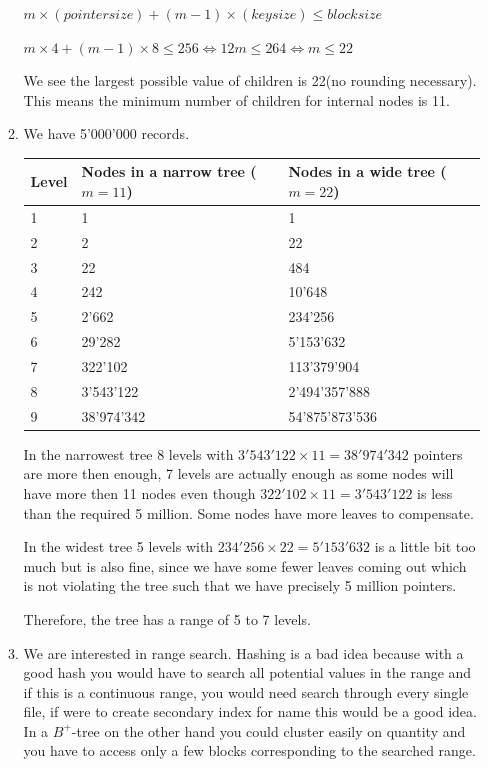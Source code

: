 \documentclass[12pt]{extarticle}
\begin{document}
\begin{flushleft}
\begin{enumerate}[label=\textbf{\Alph*.}]
\begin{enumerate}[label=\arabic*)]
$ m \times (pointer size) + (m-1) \times (key size)\leq block size$

$m \times 4+ (m-1) \times 8 \leq 256 \Leftrightarrow 12m\leq264\Leftrightarrow m\leq 22$

We see the largest possible value of children is 22(no rounding necessary). This means the minimum number of children for internal nodes is 11. 
\item 
We have 5'000'000 records. 

\begin{tabular}{lll}
\hline
Level & Nodes in a narrow tree (\(m=11\))& Nodes in a wide tree (\(m=22\))\\
\hline
1     & 1          & 1          \\
2     & 2          & 22         \\
3     & 22         & 484        \\
4     & 242        & 10'648     \\
5     & 2'662      & 234'256    \\
6     & 29'282     & 5'153'632\\
7     & 322'102    & 113'379'904\\
8     & 3'543'122  & 2'494'357'888\\
9	& 38'974'342&54'875'873'536\\
\hline
\end{tabular}

In the narrowest tree 8 levels with $3'543'122\times 11=38'974'342$ pointers are more then enough, 7 levels are actually enough as some nodes will have more then 11 nodes even though $ 322'102\times 11 = 3'543'122$ is less than the required 5 million. Some nodes have more leaves to compensate.

In the widest tree 5 levels with $234'256 \times 22=5'153'632$ is a little bit too much but is also fine, since we have some fewer leaves coming out which is not violating the tree such that we have precisely 5 million pointers.  

Therefore, the tree has a range of 5 to 7 levels.
\item We are interested in range search. Hashing is a bad idea because with a good hash you would have to search all potential values in the range and if this is a continuous range, you would need search through every single file, if were to create secondary index for name this would be a good idea. In a $B^+$-tree on the other hand you could cluster easily on quantity and you have to access only a few blocks corresponding to the searched range. 


\end{enumerate}
\end{enumerate}
\end{flushleft}
\end{document}
